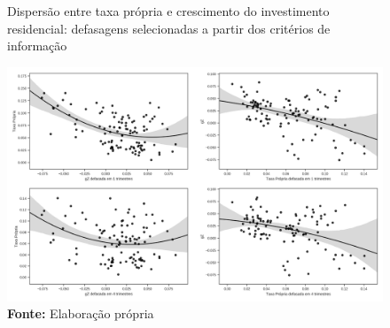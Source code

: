 \begin{figure}[htb]
	\centering
	\caption{Dispersão entre taxa própria e crescimento do investimento residencial: defasagens selecionadas a partir dos critérios de informação}
	\label{defasagens}
	\includegraphics[width=\textwidth]{../../Modelo/SeriesTemporais/figs/VEC_Defasagens.png}
	\caption*{\textbf{Fonte:} Elaboração própria}
\end{figure}



